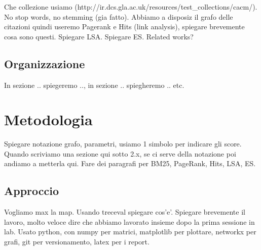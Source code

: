 \documentclass{llncs}
\begin{document}
Che collezione usiamo (http://ir.dcs.gla.ac.uk/resources/test\_collections/cacm/). No stop words, no stemming (gia fatto). 
Abbiamo a disposiz il grafo delle citazioni quindi useremo Pagerank e Hits (link analysis), spiegare brevemente cosa sono questi. Spiegare LSA. Spiegare ES. Related works?
\subsection{Organizzazione}
In sezione .. spiegeremo .., in sezione .. spiegheremo .. etc.

%

\section{Metodologia}
\label{sec:metodologia}

Spiegare notazione grafo, parametri, usiamo 1 simbolo per indicare gli score. Quando scriviamo una sezione qui sotto 2.x, se ci serve della notazione poi andiamo a metterla qui. 
Fare dei paragrafi per BM25, PageRank, Hits, LSA, ES.


\subsection{Approccio}
\label{sec:approccio}

Vogliamo max la map. Usando treceval spiegare cos'e'. Spiegare brevemente il lavoro, molto veloce dire che abbiamo lavorato insieme dopo la prima sessione in lab. Usato python, con numpy per matrici, matplotlib per plottare, networkx per grafi, git per versionamento, latex per i report.
\end{document}
